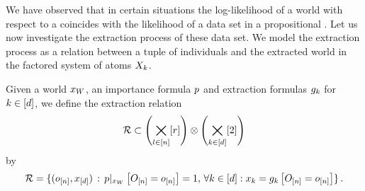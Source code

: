 
We have observed that in certain situations the log-likelihood of a \firstOrderLogic{} world with respect to a \HybridFOLNetwork{} coincides with the likelihood of a data set in a propositional \HybridLogicNetwork{}.
Let us now investigate the extraction process of these data set.
We model the extraction process as a relation between a tuple of individuals and the extracted world in the factored system of atoms $X_{k}$.

\begin{definition}
    \label{def:extractionRelation}
    Given a \firstOrderLogic{} world $x_{W}$, an importance formula $p$ and extraction formulas $g_{k}$ for $k\in[d]$, we define the extraction relation
    \begin{align*}
        \mathcal{R} \subset \left(\bigtimes_{l\in[n]}[r]\right) \otimes \left(\bigtimes_{k\in[d]}[2]\right)
    \end{align*}
    by
    \begin{align*}
        \mathcal{R}
        = \{ (o_{[n]}, x_{[d]})
        \,:\,  {p}|_{x_{W}} \left[O_{[n]}=o_{[n]}\right] = 1 ,\, \forall{k\in[d]}:{x_{k} = g_{k}\left[O_{[n]}=o_{[n]}\right]} \} \, .
    \end{align*}
\end{definition}

